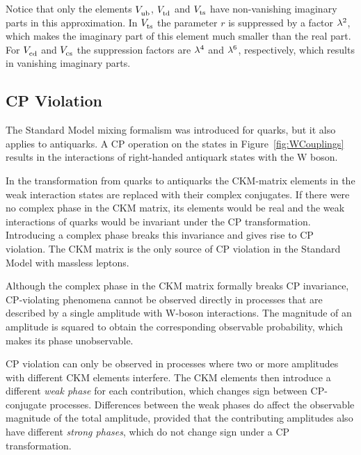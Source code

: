 Notice that only the elements $\Vub$, $\Vtd$ and $\Vts$ have non-vanishing imaginary parts in this approximation. In $\Vts$ the parameter $r$ is suppressed by a
factor $\lambda^2$, which makes the imaginary part of this element much smaller than the real part. For $\Vcd$ and $\Vcs$ the suppression
factors are $\lambda^4$ and $\lambda^6$, respectively, which results in vanishing imaginary parts.


\subsection{CP Violation}
\label{subsec:intro_mixCPV_CPV}

The Standard Model mixing formalism was introduced for quarks, but it also applies to antiquarks. A CP operation on the states in
Figure~\ref{fig:WCouplings} results in the interactions of right-handed antiquark states with the W boson.

In the transformation from quarks to antiquarks the CKM-matrix elements in the weak interaction states are replaced with their complex
conjugates. If there were no complex phase in the CKM matrix, its elements would be real and the weak interactions of quarks would be
invariant under the CP transformation. Introducing a complex phase breaks this invariance and gives rise to CP violation. The CKM matrix is
the only source of CP violation in the Standard Model with massless leptons.

Although the complex phase in the CKM matrix formally breaks CP invariance, CP-violating phenomena cannot be observed directly in processes
that are described by a single amplitude with W-boson interactions. The magnitude of an amplitude is squared to obtain the corresponding
observable probability, which makes its phase unobservable.

CP violation can only be observed in processes where two or more amplitudes with different CKM elements interfere. The CKM elements then
introduce a different \emph{weak phase} for each contribution, which changes sign between CP-conjugate processes. Differences between the
weak phases do affect the observable magnitude of the total amplitude, provided that the contributing amplitudes also have different
\emph{strong phases}, which do not change sign under a CP transformation.

